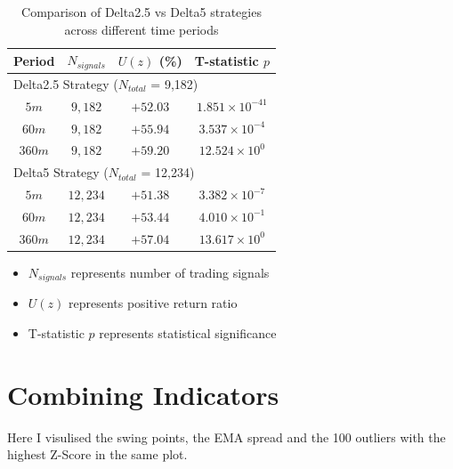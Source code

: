 \documentclass[12pt]{article}
\begin{document}
\begin{table}[h]
\begin{tabular}{cccc}
\hline
Period & $N_{signals}$ & $U(z)$ (\%) & T-statistic $p$ \\
\hline
\multicolumn{4}{l}{Delta2.5 Strategy ($N_{total}$ = 9,182)} \\
\hline
  $5m$ & $9,182$ & $+52.03$ & $1.851 \times 10^{-41}$ \\
  $60m$ & $9,182$ & $+55.94$ & $3.537 \times 10^{-4}$ \\
  $360m$ & $9,182$ & $+59.20$ & $12.524 \times 10^{0}$ \\
  \hline
  \multicolumn{4}{l}{Delta5 Strategy ($N_{total}$ = 12,234)} \\
  \hline
  $5m$ & $12,234$ & $+51.38$ & $3.382 \times 10^{-7}$ \\
  $60m$ & $12,234$ & $+53.44$ & $4.010 \times 10^{-1}$ \\
  $360m$ & $12,234$ & $+57.04$ & $13.617 \times 10^{0}$ \\
\hline
\end{tabular}
\caption{Comparison of Delta2.5 vs Delta5 strategies across different time periods}
\end{table}

\begin{itemize}
  \item $N_{signals}$ represents number of trading signals
  \item $U(z)$ represents positive return ratio
  \item T-statistic $p$ represents statistical significance
\end{itemize}











\newpage
\section{Combining Indicators}
Here I visulised the swing points, the EMA spread and the 100 outliers with the highest Z-Score in the same plot.
\end{document}

